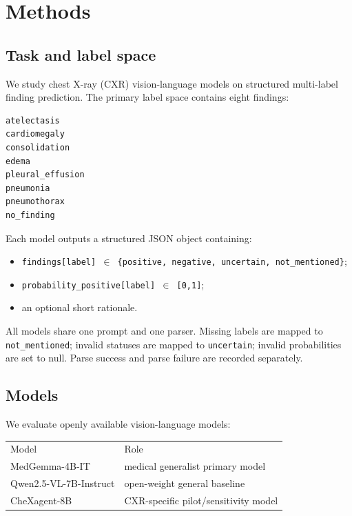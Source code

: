 \section{Methods}

\subsection{Task and label space}

We study chest X-ray (CXR) vision-language models on structured multi-label finding prediction. The primary label space contains eight findings:

\begin{verbatim}
atelectasis
cardiomegaly
consolidation
edema
pleural_effusion
pneumonia
pneumothorax
no_finding
\end{verbatim}

Each model outputs a structured JSON object containing:

\begin{itemize}
\item \texttt{findings[label] $\in$ \{positive, negative, uncertain, not\_mentioned\}};
\item \texttt{probability\_positive[label] $\in$ [0,1]};
\item an optional short rationale.
\end{itemize}

All models share one prompt and one parser. Missing labels are mapped to \texttt{not\_mentioned}; invalid statuses are mapped to \texttt{uncertain}; invalid probabilities are set to null. Parse success and parse failure are recorded separately.

\subsection{Models}

We evaluate openly available vision-language models:

\begin{table}[t]
\centering
\small
\begin{tabular}{ll}
\hline
Model & Role \\
MedGemma-4B-IT & medical generalist primary model \\
Qwen2.5-VL-7B-Instruct & open-weight general baseline \\
CheXagent-8B & CXR-specific pilot/sensitivity model \\
\hline
\end{tabular}
\end{table}


